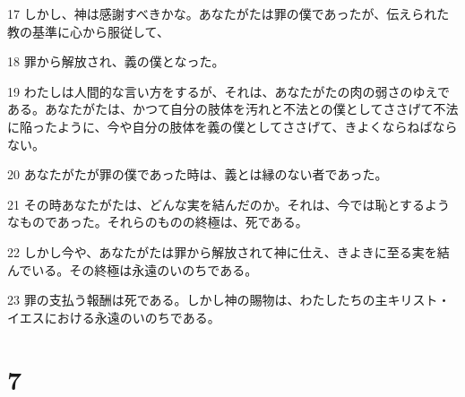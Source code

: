 \par 17 しかし、神は感謝すべきかな。あなたがたは罪の僕であったが、伝えられた教の基準に心から服従して、
\par 18 罪から解放され、義の僕となった。
\par 19 わたしは人間的な言い方をするが、それは、あなたがたの肉の弱さのゆえである。あなたがたは、かつて自分の肢体を汚れと不法との僕としてささげて不法に陥ったように、今や自分の肢体を義の僕としてささげて、きよくならねばならない。
\par 20 あなたがたが罪の僕であった時は、義とは縁のない者であった。
\par 21 その時あなたがたは、どんな実を結んだのか。それは、今では恥とするようなものであった。それらのものの終極は、死である。
\par 22 しかし今や、あなたがたは罪から解放されて神に仕え、きよきに至る実を結んでいる。その終極は永遠のいのちである。
\par 23 罪の支払う報酬は死である。しかし神の賜物は、わたしたちの主キリスト・イエスにおける永遠のいのちである。

\chapter{7}

